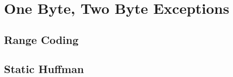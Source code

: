 \section{One Byte, Two Byte Exceptions}
\label{sec:vbbe21}

\subsection{Range Coding}

\subsection{Static Huffman}
